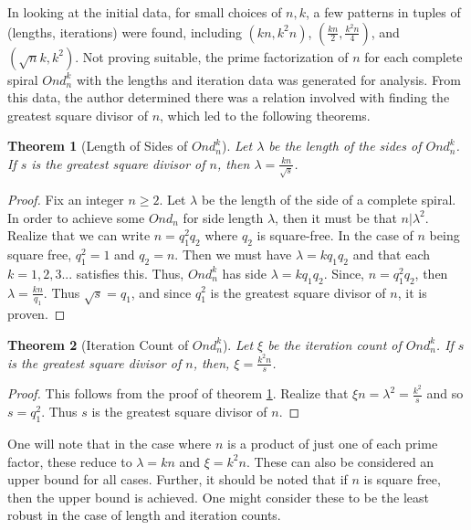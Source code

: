 \documentclass[11pt]{amsart}
\theoremstyle{mydef}
\newtheorem{thm}{Theorem}[section]
\begin{document}
In looking at the initial data, for small choices of $n, k$, a few patterns in tuples of (lengths, iterations) were found, including $(kn, k^2 n)$, $(\frac{kn}{2}, \frac{k^2 n}{4})$, and $(\sqrt{n}k, k^2)$. Not proving suitable, the prime factorization of $n$ for each complete spiral $Ond^k_n$ with the lengths and iteration data was generated for analysis. From this data, the author determined there was a relation involved with finding the greatest square divisor of $n$, which led to the following theorems.

\begin{thm}[Length of Sides of $Ond^k_n$]
Let $\lambda$ be the length of the sides of $Ond^k_n$. If $s$ is the greatest square divisor of $n$, then $\lambda = \frac{kn}{\sqrt{s}}$.
\label{lenthm}
\end{thm}

\begin{proof}
Fix an integer $n \ge 2$.  Let $\lambda$ be the length of the side of a complete spiral. In order to achieve some $Ond_n$ for side length $\lambda$, then it must be that $n \vert \lambda^2$. Realize that we can write $n = q^2_1 q_2$ where $q_2$ is square-free. In the case of $n$ being square free, $q^2_1 = 1$ and $q_2 = n$. Then we must have $\lambda = k q_1 q_2$ and that each $k = 1, 2, 3...$ satisfies this. Thus, $Ond^k_n$ has side $\lambda = k q_1 q_2$. Since, $n = q^2_1 q_2$, then  $\lambda = \frac{kn}{q_1}$. Thus $\sqrt{s} = q_1$, and since $q^2_1$ is the greatest square divisor of $n$, it is proven.
\end{proof}

\begin{thm}[Iteration Count of $Ond^k_n$]
Let $\xi$ be the iteration count  of $Ond^k_n$. If $s$ is the greatest square divisor of $n$,  then, $\xi = \frac{k^2n}{s}$.
\end{thm}


\begin{proof}
This follows from the proof of theorem \ref{lenthm}. Realize that $\xi n = \lambda^2 = \frac{k^2}{s}$ and so $s = q^2_1$. Thus $s$ is the greatest square divisor of $n$.
\end{proof}



One will note that in the case where $n$ is a product of just one of each prime factor, these reduce to $\lambda = k n$ and $\xi = k^2 n$. These can also be considered an upper bound for all cases. Further, it should be noted that if $n$ is square free, then the upper bound is achieved. One might consider these to be the least robust in the case of length and iteration counts.
\end{document}
